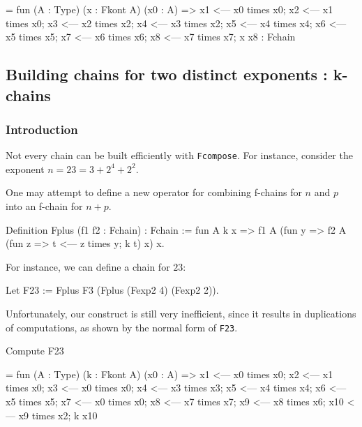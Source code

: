 \begin{Coqanswer}
= fun (A : Type) (x : Fkont A) (x0 : A) =>
       x1 <--- x0 times x0;
       x2 <--- x1 times x0;
       x3 <--- x2 times x2;
       x4 <--- x3 times x2;
       x5 <--- x4 times x4;
       x6 <--- x5 times x5; 
       x7 <--- x6 times x6; 
       x8 <--- x7 times x7; 
       x x8
     : Fchain  
\end{Coqanswer}



\subsection{Building chains for two distinct exponents : k-chains  \label{Kkonts-section}}

\subsubsection{Introduction}
Not every chain can be built efficiently  with \texttt{Fcompose}.
 For instance, consider the exponent $n= 23 = 3 + 2^4 + 2^2$. 

One may attempt to define a new operator  for combining f-chains for 
$n$ and $p$ into an f-chain for $n+p$.

\begin{Coqbad}
Definition Fplus (f1 f2 : Fchain) : Fchain :=
  fun A k x => 
   f1 A (fun y => 
            f2 A (fun z => t <--- z times y; k t) x) 
            x.
\end{Coqbad}

For instance, we can define a chain for $23$:

\begin{Coqbad}
Let F23 := Fplus F3 (Fplus (Fexp2 4) (Fexp2 2)).  
\end{Coqbad}

Unfortunately, our construct is still very inefficient, since it results in 
duplications of computations, as shown by the normal form of \texttt{F23}.

\begin{Coqbad}
Compute F23
\end{Coqbad}

\begin{Coqanswer}
 = fun (A : Type) (k : Fkont A) (x0 : A) =>
       x1 <--- x0 times x0;
       x2 <--- x1 times x0;
       x3 <--- x0 times x0;
       x4 <--- x3 times x3;
       x5 <--- x4 times x4;
       x6 <--- x5 times x5;
       x7 <--- x0 times x0;
       x8 <--- x7 times x7; 
       x9 <--- x8 times x6; 
       x10 <--- x9 times x2; 
       k x10
\end{Coqanswer}

